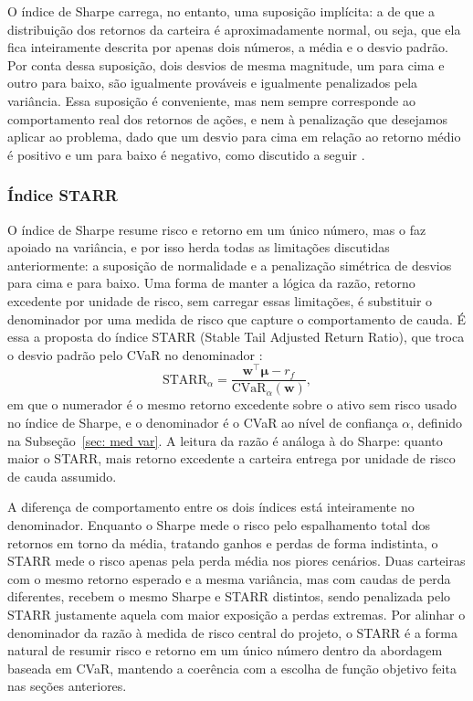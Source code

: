 \documentclass[12pt,a4paper]{article}
\begin{document}
O índice de Sharpe carrega, no entanto, uma suposição implícita: a de que a distribuição dos retornos da carteira é aproximadamente normal, ou seja, que ela fica inteiramente descrita por apenas dois números, a média e o desvio padrão. Por conta dessa suposição, dois desvios de mesma magnitude, um para cima e outro para baixo, são igualmente prováveis e igualmente penalizados pela variância. Essa suposição é conveniente, mas nem sempre corresponde ao comportamento real dos retornos de ações, e nem à penalização que desejamos aplicar ao problema, dado que um desvio para cima em relação ao retorno médio é positivo e um para baixo é negativo, como discutido a seguir \cite{fabozzi2008portfolio}.

\subsubsection{Índice STARR}

O índice de Sharpe resume risco e retorno em um único número, mas o faz apoiado na variância, e por isso herda todas as limitações discutidas anteriormente: a suposição de normalidade e a penalização simétrica de desvios para cima e para baixo. Uma forma de manter a lógica da razão, retorno excedente por unidade de risco, sem carregar essas limitações, é substituir o denominador por uma medida de risco que capture o comportamento de cauda. É essa a proposta do índice STARR (Stable Tail Adjusted Return Ratio), que troca o desvio padrão pelo CVaR no denominador \cite{martin2003phi}:
\begin{equation}
\mathrm{STARR}_\alpha = \frac{\mathbf{w}^\top \boldsymbol{\mu} - r_f}{\mathrm{CVaR}_\alpha(\mathbf{w})},
\label{eq:starr}
\end{equation}
em que o numerador é o mesmo retorno excedente sobre o ativo sem risco usado no índice de Sharpe, e o denominador é o CVaR ao nível de confiança $\alpha$, definido na Subseção~\ref{sec: med var}. A leitura da razão é análoga à do Sharpe: quanto maior o STARR, mais retorno excedente a carteira entrega por unidade de risco de cauda assumido.

A diferença de comportamento entre os dois índices está inteiramente no denominador. Enquanto o Sharpe mede o risco pelo espalhamento total dos retornos em torno da média, tratando ganhos e perdas de forma indistinta, o STARR mede o risco apenas pela perda média nos piores cenários. Duas carteiras com o mesmo retorno esperado e a mesma variância, mas com caudas de perda diferentes, recebem o mesmo Sharpe e STARR distintos, sendo penalizada pelo STARR justamente aquela com maior exposição a perdas extremas. Por alinhar o denominador da razão à medida de risco central do projeto, o STARR é a forma natural de resumir risco e retorno em um único número dentro da abordagem baseada em CVaR, mantendo a coerência com a escolha de função objetivo feita nas seções anteriores.
\end{document}
